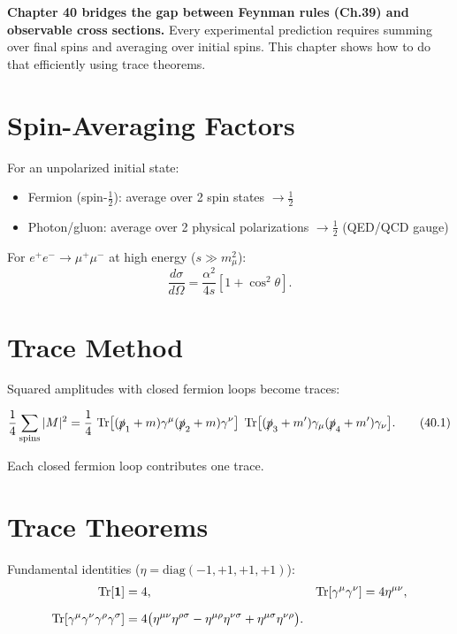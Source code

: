 \begin{mdframed}[backgroundcolor=blue!5]
\textbf{Chapter 40 bridges the gap between Feynman rules (Ch.39) and
observable cross sections.} Every experimental prediction requires
summing over final spins and averaging over initial spins. This chapter
shows how to do that efficiently using trace theorems.
\end{mdframed}

\section{Spin-Averaging Factors}\label{sec:averaging}
For an unpolarized initial state:
\begin{itemize}
\item Fermion (spin-$\frac12$): average over 2 spin states $\to \frac12$
\item Photon/gluon: average over 2 physical polarizations $\to \frac12$ (QED/QCD gauge)
\end{itemize}
For $e^+e^-\to\mu^+\mu^-$ at high energy ($s\gg m_\mu^2$):
\begin{equation}
\frac{d\sigma}{d\Omega}
= \frac{\alpha^2}{4s}\left[1+\cos^2\theta\right] .
\tag{40.$\star$}
\end{equation}

\section{Trace Method}\label{sec:trace_method}
Squared amplitudes with closed fermion loops become traces:
\begin{mdframed}[backgroundcolor=green!5]
\begin{equation}
\frac{1}{4}\sum_{\rm spins}|M|^2
= \frac{1}{4}\,\operatorname{Tr}\bigl[(\slashed{p}_1+m)\gamma^\mu(\slashed{p}_2+m)\gamma^\nu\bigr]\;
\operatorname{Tr}\bigl[(\slashed{p}_3+m')\gamma_\mu(\slashed{p}_4+m')\gamma_\nu\bigr] .
\tag{40.1}
\end{equation}
\end{mdframed}
Each closed fermion loop contributes one trace.

\section{Trace Theorems}\label{sec:trace_theorems}
Fundamental identities ($\eta=\mathrm{diag}(-1,+1,+1,+1)$):
\begin{align}
\operatorname{Tr}[\mathbf{1}] &= 4, &
\operatorname{Tr}[\gamma^\mu\gamma^\nu] &= 4\eta^{\mu\nu}, \\[2mm]
\operatorname{Tr}[\gamma^\mu\gamma^\nu\gamma^\rho\gamma^\sigma]
&= 4\bigl(\eta^{\mu\nu}\eta^{\rho\sigma}
          -\eta^{\mu\rho}\eta^{\nu\sigma}
          +\eta^{\mu\sigma}\eta^{\nu\rho}\bigr) .
\end{align}

